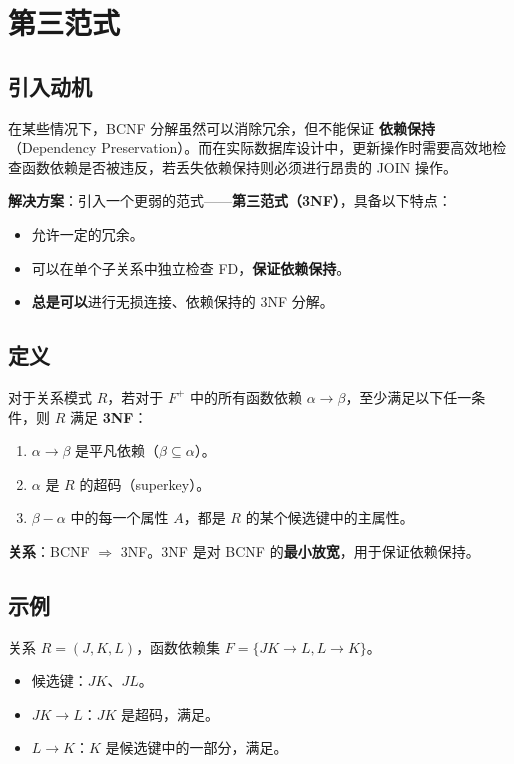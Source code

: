 \section{第三范式}

\subsection{引入动机}

在某些情况下，BCNF 分解虽然可以消除冗余，但不能保证 \textbf{依赖保持}（Dependency Preservation）。而在实际数据库设计中，更新操作时需要高效地检查函数依赖是否被违反，若丢失依赖保持则必须进行昂贵的 JOIN 操作。

\textbf{解决方案}：引入一个更弱的范式——\textbf{第三范式（3NF）}，具备以下特点：

\begin{itemize}
    \item 允许一定的冗余。
    \item 可以在单个子关系中独立检查 FD，\textbf{保证依赖保持}。
    \item \textbf{总是可以}进行无损连接、依赖保持的 3NF 分解。
\end{itemize}

\subsection{定义}

对于关系模式 $R$，若对于 $F^+$ 中的所有函数依赖 $\alpha \to \beta$，至少满足以下任一条件，则 $R$ 满足 \textbf{3NF}：

\begin{enumerate}
    \item $\alpha \to \beta$ 是平凡依赖（$\beta \subseteq \alpha$）。
    \item $\alpha$ 是 $R$ 的超码（superkey）。
    \item $\beta - \alpha$ 中的每一个属性 $A$，都是 $R$ 的某个候选键中的主属性。
\end{enumerate}

\textbf{关系}：BCNF $\Rightarrow$ 3NF。3NF 是对 BCNF 的\textbf{最小放宽}，用于保证依赖保持。

\subsection{示例}

关系 $R = (J, K, L)$，函数依赖集 $F = \{ JK \to L, L \to K \}$。

\begin{itemize}
    \item 候选键：$JK$、$JL$。
    \item $JK \to L$：$JK$ 是超码，满足。
    \item $L \to K$：$K$ 是候选键中的一部分，满足。
\end{itemize}

